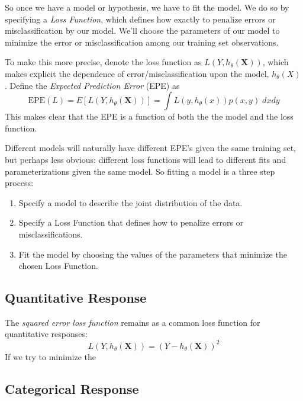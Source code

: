 \documentclass[12pt]{article}
\begin{document}
So once we have a model or hypothesis, we have to fit
the model. We do so by specifying a \emph{Loss Function},
which defines how exactly to penalize errors or misclassification
by our model.  We'll choose the parameters of our model
to minimize the error or misclassification among our
training set observations.

To make this more precise, denote the loss function as
$L\left(Y, h_\theta(\mathbf{X})\right)$, which makes explicit the
dependence of error/misclassification upon the model,
$h_\theta(X)$.
Define the {\sl Expected Prediction Error} (EPE) as
\begin{equation}
    \text{EPE}(L) = E\left[ L\left(Y, h_\theta(\mathbf{X})\right)\right] =
        \int L\left(y, h_\theta(x)\right) p(x, y) \; dx dy
\end{equation}
This makes clear that the EPE is a function of both the
the model and the loss function.

Different models will naturally have different EPE's
given the same training set, but perhaps less obvious:
different loss functions will lead to different fits
and parameterizations given the same model. So fitting
a model is a three step process:
\begin{enumerate}
    \item Specify a model to describe the joint
        distribution of the data.
    \item Specify a Loss Function that defines how
        to penalize errors or misclassifications.
    \item Fit the model by choosing the values of the
        parameters that minimize the chosen Loss Function.
\end{enumerate}

\subsection{Quantitative Response}

The \emph{squared error loss function} remains as a
common loss function for quantitative responses:
\begin{equation}
    \label{sqerror}
    L\left(Y, h_\theta(\mathbf{X})\right) = \left(Y -
        h_\theta(\mathbf{X})\right)^2
\end{equation}
If we try to minimize the



\subsection{Categorical Response}
\end{document}
